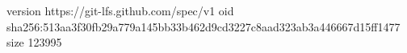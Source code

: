 version https://git-lfs.github.com/spec/v1
oid sha256:513aa3f30fb29a779a145bb33b462d9cd3227c8aad323ab3a446667d15ff1477
size 123995
